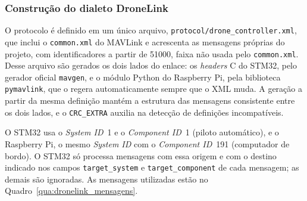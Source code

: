 \subsubsection{Construção do dialeto DroneLink}\label{subsubsec:com_dialeto}

O protocolo é definido em um único arquivo, \texttt{protocol/drone\_controller.xml}, que inclui o \texttt{common.xml} do MAVLink e acrescenta as mensagens próprias do projeto, com identificadores a partir de 51000, faixa não usada pelo \texttt{common.xml}. Desse arquivo são gerados os dois lados do enlace: os \textit{headers} C do STM32, pelo gerador oficial \texttt{mavgen}, e o módulo Python do Raspberry Pi, pela biblioteca \texttt{pymavlink}, que o regera automaticamente sempre que o XML muda. A geração a partir da mesma definição mantém a estrutura das mensagens consistente entre os dois lados, e o \texttt{CRC\_EXTRA} auxilia na detecção de definições incompatíveis.

O STM32 usa o \textit{System ID}~1 e o \textit{Component ID}~1 (piloto automático), e o Raspberry Pi, o mesmo \textit{System ID} com o \textit{Component ID}~191 (computador de bordo). O STM32 só processa mensagens com essa origem e com o destino indicado nos campos \texttt{target\_system} e \texttt{target\_component} de cada mensagem; as demais são ignoradas. As mensagens utilizadas estão no Quadro~\ref{qua:dronelink_mensagens}.

